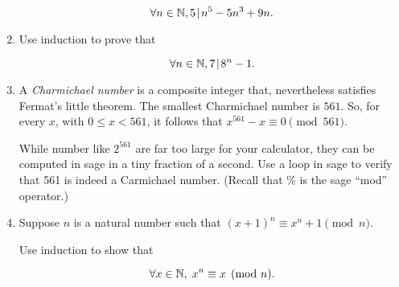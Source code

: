 \documentclass{amsart}
\begin{document}
\begin{enumerate}
\[ \forall n \in {\mathbb N}, 5 \!\mid\! n^5 - 5n^3 + 9n. \]

\vfill

\item Use induction to prove that

\[ \forall n \in {\mathbb N}, 7 \!\mid\! 8^n - 1 . \]

\vfill

\newpage

\item A {\em Charmichael number} is a composite integer that, nevertheless
satisfies Fermat’s little theorem. The smallest Charmichael number
is $561$. So, for every $x$, with $0 \leq x < 561$, it follows that $x^{561} - x \equiv 0 \pmod{561}$.

While number like $2^{561}$ are far too large for your calculator, they
can be computed in sage in a tiny fraction of a second.
Use a loop in sage to verify that 561 is indeed a Carmichael
number. (Recall that \% is the sage “mod” operator.)

\vfill

\item Suppose $n$ is a natural number such that $(x+1)^n \equiv  x^n+1 \pmod{n}$.

Use induction to show that

\[ \forall x \in {\mathbb N}, \; x^n  \equiv x \pmod {n}.  \]

\vfill

\end{enumerate}
\end{document}
